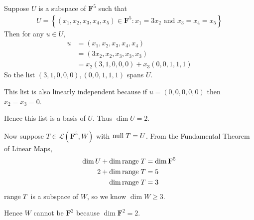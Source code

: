 \documentclass[a5paper]{article}
\begin{document}
\newcommand    \C          {\mathbf{C}}
\newcommand    \R          {\mathbf{R}}
\renewcommand  \L          {\mathcal{L}}
\newcommand    \F          {\mathbf{F}}
\renewcommand  \P          {\mathcal{P}}
\newcommand    \nullspace  {\text{null\;}}
\newcommand    \range      {\text{range\;}}
\newcommand    \linspan    {\text{span\;}}

    Suppose $U$ is a subspace of $\F^5$ such that
\begin{align*}
        U = \left\{ (x_1,x_2,x_3,x_4,x_5) \in \F^5 : x_1=3x_2 \text{ and } x_3=x_4=x_5 \right\}
\end{align*}
    Then for any $u \in U$,
\begin{align*}
        u &= (x_1, x_2, x_3, x_4, x_4)          \\
          &= (3x_2, x_2, x_3, x_3, x_3)         \\
          &= x_2(3,1,0,0,0) + x_3(0,0,1,1,1)
\end{align*}
    So the list $(3,1,0,0,0), (0,0,1,1,1)$ spans $U$.

    This list is also linearly independent because if $u=(0,0,0,0,0)$ then $x_2=x_3=0$.

    Hence this list is a basis of $U$.
    Thus $\dim U = 2$.

    Now suppose $T \in \L(\F^5,W)$ with $\nullspace T = U$.
    From the Fundamental Theorem of Linear Maps,
\begin{align*}
                   \dim U + \dim \range T &= \dim \F^5     \\
                        2 + \dim \range T &= 5             \\
                            \dim \range T &= 3
\end{align*}
    $\range T$ is a subspace of $W$, so we know $\dim W \ge 3$.

    Hence $W$ cannot be $\F^2$ because $\dim \F^2=2$.
\end{document}
